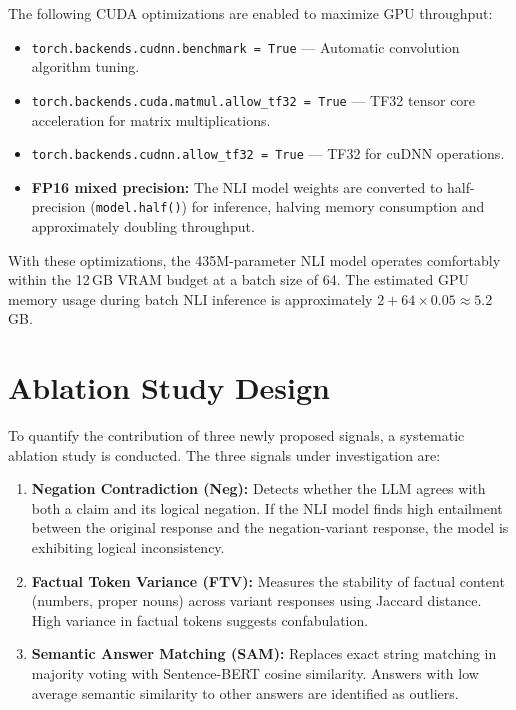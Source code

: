 The following CUDA optimizations are enabled to maximize GPU throughput:

\begin{itemize}
    \item \texttt{torch.backends.cudnn.benchmark = True} --- Automatic convolution algorithm tuning.
    \item \texttt{torch.backends.cuda.matmul.allow\_tf32 = True} --- TF32 tensor core acceleration for matrix multiplications.
    \item \texttt{torch.backends.cudnn.allow\_tf32 = True} --- TF32 for cuDNN operations.
    \item \textbf{FP16 mixed precision:} The NLI model weights are converted to half-precision (\texttt{model.half()}) for inference, halving memory consumption and approximately doubling throughput.
\end{itemize}

With these optimizations, the 435M-parameter NLI model operates comfortably within the 12\,GB VRAM budget at a batch size of 64. The estimated GPU memory usage during batch NLI inference is approximately $2 + 64 \times 0.05 \approx 5.2$\,GB.

\section{Ablation Study Design}
\label{sec:ablation-design}

To quantify the contribution of three newly proposed signals, a systematic ablation study is conducted. The three signals under investigation are:

\begin{enumerate}
    \item \textbf{Negation Contradiction (Neg):} Detects whether the LLM agrees with both a claim and its logical negation. If the NLI model finds high entailment between the original response and the negation-variant response, the model is exhibiting logical inconsistency.

    \item \textbf{Factual Token Variance (FTV):} Measures the stability of factual content (numbers, proper nouns) across variant responses using Jaccard distance. High variance in factual tokens suggests confabulation.

    \item \textbf{Semantic Answer Matching (SAM):} Replaces exact string matching in majority voting with Sentence-BERT cosine similarity. Answers with low average semantic similarity to other answers are identified as outliers.
\end{enumerate}

